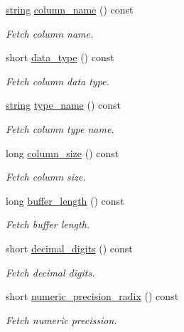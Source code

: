 \begin{DoxyCompactItemize}
\mbox{\hyperlink{namespacenanodbc_abfc0ece56278e590911ec8352774c212}{string}} \mbox{\hyperlink{classnanodbc_1_1catalog_1_1columns_a9cdc2dbee8dd4887a185649596fcce0a}{column\+\_\+name}} () const
\begin{DoxyCompactList}\small\item\em Fetch column name. \end{DoxyCompactList}\item 
short \mbox{\hyperlink{classnanodbc_1_1catalog_1_1columns_afc61c619375282c2777ecc79f6a47cd0}{data\+\_\+type}} () const
\begin{DoxyCompactList}\small\item\em Fetch column data type. \end{DoxyCompactList}\item 
\mbox{\hyperlink{namespacenanodbc_abfc0ece56278e590911ec8352774c212}{string}} \mbox{\hyperlink{classnanodbc_1_1catalog_1_1columns_a5e01f34b60ef7d038f11eb6d1d114683}{type\+\_\+name}} () const
\begin{DoxyCompactList}\small\item\em Fetch column type name. \end{DoxyCompactList}\item 
long \mbox{\hyperlink{classnanodbc_1_1catalog_1_1columns_abf0f652057e62610bce32fedd4039831}{column\+\_\+size}} () const
\begin{DoxyCompactList}\small\item\em Fetch column size. \end{DoxyCompactList}\item 
long \mbox{\hyperlink{classnanodbc_1_1catalog_1_1columns_af1616d5e1f9616bf72e3881e068fd435}{buffer\+\_\+length}} () const
\begin{DoxyCompactList}\small\item\em Fetch buffer length. \end{DoxyCompactList}\item 
short \mbox{\hyperlink{classnanodbc_1_1catalog_1_1columns_ad22f3bf4453bc59bba45b7abbde93851}{decimal\+\_\+digits}} () const
\begin{DoxyCompactList}\small\item\em Fetch decimal digits. \end{DoxyCompactList}\item 
short \mbox{\hyperlink{classnanodbc_1_1catalog_1_1columns_a3025408df3ed506759739ee6a415e70a}{numeric\+\_\+precision\+\_\+radix}} () const
\begin{DoxyCompactList}\small\item\em Fetch numeric precission. \end{DoxyCompactList}\item 

\end{DoxyCompactItemize}
